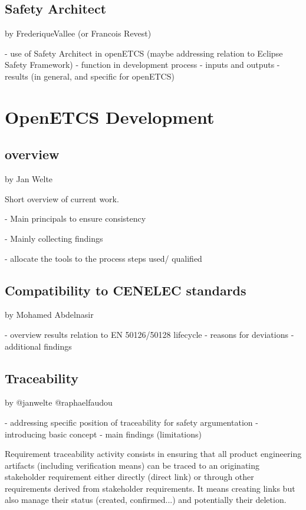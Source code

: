 \documentclass{template/openetcs_report}
\begin{document}
\section{Safety Architect}

by FrederiqueVallee (or Francois Revest)

- use of Safety Architect in openETCS (maybe addressing relation to Eclipse Safety Framework)
- function in development process
- inputs and outputs
- results (in general, and specific for openETCS)

\chapter{OpenETCS Development}
\label{sec:development-process}

\section{overview}

by Jan Welte

Short overview of current work.

- Main principals to ensure consistency 

- Mainly collecting findings

- allocate the tools to the process steps used/ qualified

\section{Compatibility to CENELEC standards}

by Mohamed Abdelnasir

- overview results relation to EN 50126/50128 lifecycle 
- reasons for deviations
- additional findings

\section{Traceability}

by @janwelte @raphaelfaudou

- addressing specific position of traceability for safety argumentation
- introducing basic concept
- main findings (limitations)

Requirement traceability activity consists in ensuring that all product engineering artifacts (including verification means) can be traced to an originating stakeholder requirement either directly (direct link) or through other requirements derived from stakeholder requirements. It means creating links but also manage their status (created, confirmed...) and potentially their deletion.
\end{document}

